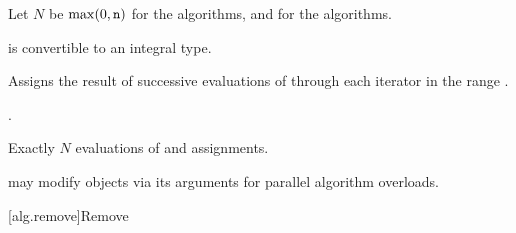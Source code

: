 \begin{itemdescr}
\pnum
Let $N$ be $\max(0, \tcode{n})$ for the  algorithms, and
 for the  algorithms.

\pnum
\mandates
{} is convertible
to an integral type.

\pnum
\effects
Assigns the result of successive evaluations of 
through each iterator in the range .

\pnum
\returns
{}.

\pnum
\complexity
Exactly $N$ evaluations of  and assignments.

\pnum
\remarks
{} may modify objects via its arguments
for parallel algorithm overloads.
\end{itemdescr}

[alg.remove]{Remove}


